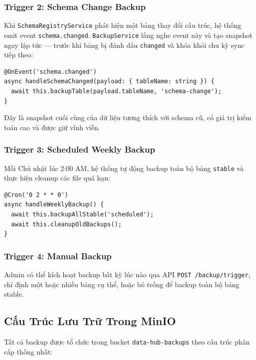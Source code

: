 \subsubsection{Trigger 2: Schema Change Backup}

Khi \texttt{SchemaRegistryService} phát hiện một bảng thay đổi cấu trúc,
hệ thống emit event \texttt{schema.changed}. \texttt{BackupService} lắng nghe
event này và tạo snapshot ngay lập tức — trước khi bảng bị đánh dấu
\texttt{changed} và khóa khỏi chu kỳ sync tiếp theo:

\begin{lstlisting}[caption={Xử lý event schema.changed}]
@OnEvent('schema.changed')
async handleSchemaChanged(payload: { tableName: string }) {
  await this.backupTable(payload.tableName, 'schema-change');
}
\end{lstlisting}

Đây là snapshot cuối cùng của dữ liệu tương thích với schema cũ, có giá trị
kiểm toán cao và được giữ vĩnh viễn.

\subsubsection{Trigger 3: Scheduled Weekly Backup}

Mỗi Chủ nhật lúc 2:00 AM, hệ thống tự động backup toàn bộ bảng
\texttt{stable} và thực hiện cleanup các file quá hạn:

\begin{lstlisting}[caption={Scheduled backup mỗi Chủ nhật 2:00 AM}]
@Cron('0 2 * * 0')
async handleWeeklyBackup() {
  await this.backupAllStable('scheduled');
  await this.cleanupOldBackups();
}
\end{lstlisting}

\subsubsection{Trigger 4: Manual Backup}

Admin có thể kích hoạt backup bất kỳ lúc nào qua API
\texttt{POST /backup/trigger}, chỉ định một hoặc nhiều bảng cụ thể, hoặc bỏ
trống để backup toàn bộ bảng stable.

\subsection{Cấu Trúc Lưu Trữ Trong MinIO}


Tất cả backup được tổ chức trong bucket \texttt{data-hub-backups} theo cấu
trúc phân cấp thống nhất:

